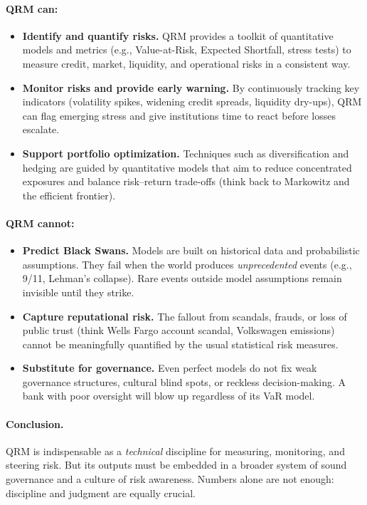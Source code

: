 \paragraph{QRM can:}
\begin{itemize}
  \item \textbf{Identify and quantify risks.}  
  QRM provides a toolkit of quantitative models and metrics (e.g., Value-at-Risk, Expected Shortfall, stress tests) to measure credit, market, liquidity, and operational risks in a consistent way.
  
  \item \textbf{Monitor risks and provide early warning.}  
  By continuously tracking key indicators (volatility spikes, widening credit spreads, liquidity dry-ups), QRM can flag emerging stress and give institutions time to react before losses escalate.
  
  \item \textbf{Support portfolio optimization.}  
  Techniques such as diversification and hedging are guided by quantitative models that aim to reduce concentrated exposures and balance risk–return trade-offs (think back to Markowitz and the efficient frontier).
\end{itemize}

\paragraph{QRM cannot:}
\begin{itemize}
  \item \textbf{Predict Black Swans.}  
  Models are built on historical data and probabilistic assumptions. They fail when the world produces \emph{unprecedented} events (e.g., 9/11, Lehman’s collapse). Rare events outside model assumptions remain invisible until they strike.
  
  \item \textbf{Capture reputational risk.}  
  The fallout from scandals, frauds, or loss of public trust (think Wells Fargo account scandal, Volkswagen emissions) cannot be meaningfully quantified by the usual statistical risk measures.
  
  \item \textbf{Substitute for governance.}  
  Even perfect models do not fix weak governance structures, cultural blind spots, or reckless decision-making. A bank with poor oversight will blow up regardless of its VaR model.
\end{itemize}

\paragraph{Conclusion.}
QRM is indispensable as a \emph{technical} discipline for measuring, monitoring, and steering risk. But its outputs must be embedded in a broader system of sound governance and a culture of risk awareness. Numbers alone are not enough: discipline and judgment are equally crucial.